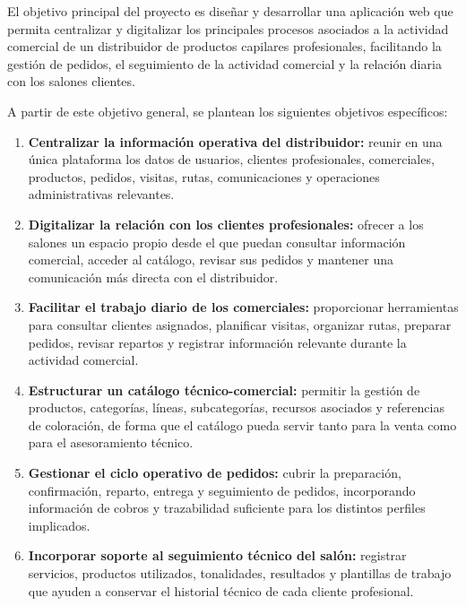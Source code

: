 El objetivo principal del proyecto es diseñar y desarrollar una aplicación web que permita centralizar y digitalizar los principales procesos asociados a la actividad comercial de un distribuidor de productos capilares profesionales, facilitando la gestión de pedidos, el seguimiento de la actividad comercial y la relación diaria con los salones clientes.

A partir de este objetivo general, se plantean los siguientes objetivos específicos:

\begin{enumerate}
    \item \textbf{Centralizar la información operativa del distribuidor:} reunir en una única plataforma los datos de usuarios, clientes profesionales, comerciales, productos, pedidos, visitas, rutas, comunicaciones y operaciones administrativas relevantes.

    \item \textbf{Digitalizar la relación con los clientes profesionales:} ofrecer a los salones un espacio propio desde el que puedan consultar información comercial, acceder al catálogo, revisar sus pedidos y mantener una comunicación más directa con el distribuidor.

    \item \textbf{Facilitar el trabajo diario de los comerciales:} proporcionar herramientas para consultar clientes asignados, planificar visitas, organizar rutas, preparar pedidos, revisar repartos y registrar información relevante durante la actividad comercial.

    \item \textbf{Estructurar un catálogo técnico-comercial:} permitir la gestión de productos, categorías, líneas, subcategorías, recursos asociados y referencias de coloración, de forma que el catálogo pueda servir tanto para la venta como para el asesoramiento técnico.

    \item \textbf{Gestionar el ciclo operativo de pedidos:} cubrir la preparación, confirmación, reparto, entrega y seguimiento de pedidos, incorporando información de cobros y trazabilidad suficiente para los distintos perfiles implicados.

    \item \textbf{Incorporar soporte al seguimiento técnico del salón:} registrar servicios, productos utilizados, tonalidades, resultados y plantillas de trabajo que ayuden a conservar el historial técnico de cada cliente profesional.


\end{enumerate}
